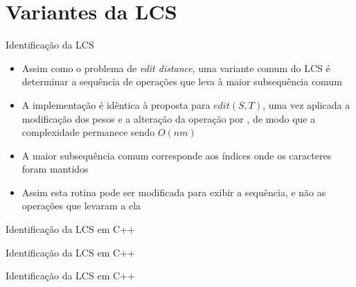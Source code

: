 \section{Variantes da LCS}

\begin{frame}[fragile]{Identificação da LCS}

    \begin{itemize}
        \item Assim como o problema de \textit{edit distance}, uma variante comum do LCS é
            determinar a sequência de operações que leva à maior subsequência comum
        \pause

        \item A implementação é idêntica à proposta para $edit(S, T)$, uma vez aplicada a 
            modificação dos pesos e a alteração da operação  por 
            , de modo que a complexidade permanece sendo $O(nm)$
        \pause

        \item A maior subsequência comum corresponde aos índices onde os caracteres foram
            mantidos
        \pause

        \item Assim esta rotina pode ser modificada para exibir a sequência, e não as operações
            que levaram a ela
    \end{itemize}

\end{frame}

\begin{frame}[fragile]{Identificação da LCS em C++}
\end{frame}

\begin{frame}[fragile]{Identificação da LCS em C++}
\end{frame}

\begin{frame}[fragile]{Identificação da LCS em C++}
\end{frame}

